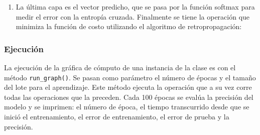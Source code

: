 \begin{enumerate}
\item La última capa es el vector predicho, que se pasa por la función softmax para
medir el error con la entropía cruzada. Finalmente se tiene la operación
 que minimiza la función de costo utilizando el algoritmo de
retropropagación:

%
\begin{sphinxVerbatim}[commandchars=\\\{\}]
   
   
  
   
\end{sphinxVerbatim}


\end{enumerate}


\subsubsection{Ejecución}

La ejecución de la gráfica de cómputo de una instancia de la clase
es con el método \texttt{run\_graph()}.
Se pasan como parámetro el número de épocas y el tamaño del lote
para el aprendizaje.
Este método ejecuta la operación
 que a su vez corre todas las operaciones que la preceden.
Cada 100 épocas se evalúa la precisión del modelo y se imprimen:
el número de época, el tiempo transcurrido desde que se inició el entrenamiento, el error de entrenamiento, el error de prueba y
la precisión.
\newline

